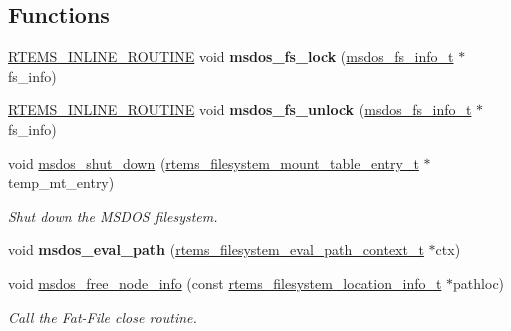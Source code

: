 \subsection*{Functions}
\begin{DoxyCompactItemize}
\item 
\mbox{\label{group__libfs__msdos_ga5ada83ed2349e74294be905d2cb5eda6}} 
\mbox{\hyperlink{group__RTEMSScoreBaseDefs_gac216239df231d5dbd15e3520b0b9313f}{R\+T\+E\+M\+S\+\_\+\+I\+N\+L\+I\+N\+E\+\_\+\+R\+O\+U\+T\+I\+NE}} void {\bfseries msdos\+\_\+fs\+\_\+lock} (\mbox{\hyperlink{structmsdos__fs__info__s}{msdos\+\_\+fs\+\_\+info\+\_\+t}} $\ast$fs\+\_\+info)
\item 
\mbox{\label{group__libfs__msdos_gae7fc9b8fc0d88be1404e3b9077a6f205}} 
\mbox{\hyperlink{group__RTEMSScoreBaseDefs_gac216239df231d5dbd15e3520b0b9313f}{R\+T\+E\+M\+S\+\_\+\+I\+N\+L\+I\+N\+E\+\_\+\+R\+O\+U\+T\+I\+NE}} void {\bfseries msdos\+\_\+fs\+\_\+unlock} (\mbox{\hyperlink{structmsdos__fs__info__s}{msdos\+\_\+fs\+\_\+info\+\_\+t}} $\ast$fs\+\_\+info)
\item 
void \mbox{\hyperlink{group__libfs__msdos_gada4176631aabceb7071617611720a04a}{msdos\+\_\+shut\+\_\+down}} (\mbox{\hyperlink{structrtems__filesystem__mount__table__entry__tt}{rtems\+\_\+filesystem\+\_\+mount\+\_\+table\+\_\+entry\+\_\+t}} $\ast$temp\+\_\+mt\+\_\+entry)
\begin{DoxyCompactList}\small\item\em Shut down the M\+S\+D\+OS filesystem. \end{DoxyCompactList}\item 
\mbox{\label{group__libfs__msdos_ga51e610d249bac67d4086b5f1fa515c49}} 
void {\bfseries msdos\+\_\+eval\+\_\+path} (\mbox{\hyperlink{structrtems__filesystem__eval__path__context__t}{rtems\+\_\+filesystem\+\_\+eval\+\_\+path\+\_\+context\+\_\+t}} $\ast$ctx)
\item 
void \mbox{\hyperlink{group__libfs__msdos_gac3300c45043a2ca7b0ddac74eadf7606}{msdos\+\_\+free\+\_\+node\+\_\+info}} (const \mbox{\hyperlink{group__LibIO_ga3252b3d31ee3c49ffff0b7604a676864}{rtems\+\_\+filesystem\+\_\+location\+\_\+info\+\_\+t}} $\ast$pathloc)
\begin{DoxyCompactList}\small\item\em Call the Fat-\/\+File close routine. \end{DoxyCompactList}\item 

\end{DoxyCompactItemize}
